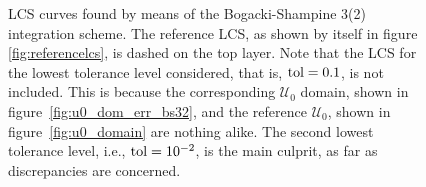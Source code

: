 \begin{figure}[htpb]
    \centering
    
    \caption[LCS curves found by means of the Bogacki-Shampine 3(2) integration
    scheme]{
        LCS curves found by means of the Bogacki-Shampine 3(2) integration
        scheme. The reference LCS, as shown by itself in figure
        \ref{fig:referencelcs}, is dashed on the top layer. Note that
        the LCS for the lowest tolerance level considered, that is,
        $\textnormal{tol}=0.1$,
        is not included. This is because the corresponding $\mathcal{U}_{0}$
        domain, shown in figure~\ref{fig:u0_dom_err_bs32}, and the reference
        $\mathcal{U}_{0}$, shown in figure~\ref{fig:u0_domain} are nothing
        alike. The second lowest tolerance level, i.e., $\textnormal{tol}=10^{-2}$,
        is the main culprit, as far as discrepancies are concerned.}
    \label{fig:lcs_rkbs32}
\end{figure}
